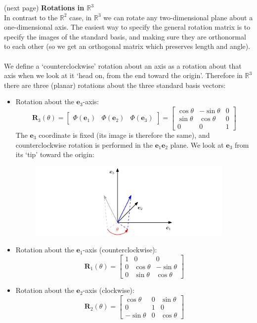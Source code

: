 \documentclass{report}
\begin{document}
(next page)
\newpage
\noindent\textbf{Rotations in $\mathbb{R}^3$}\\
In contrast to the $\mathbb{R}^2$ case, in $\mathbb{R}^3$ we can rotate any two-dimensional plane about a
one-dimensional axis. The easiest way to specify the general rotation matrix is to specify the images of the 
standard basis, and making sure they are orthonormal to each other (so we get an orthogonal matrix which
preserves length and angle).\\
\vspace{1mm}\\
We define a `counterclockwise' rotation about an axis as
a rotation about that axis when we look
at it `head on, from the end toward the origin'. Therefore in $\mathbb{R}^3$ there are three (planar) 
rotations about the three standard basis vectors:
\begin{itemize}
\item Rotation about the $\bm{e}_3$-axis:
\begin{equation*}
\bm{R}_3(\theta)=\begin{bmatrix}\Phi(\bm{e}_1)&\Phi(\bm{e}_2)&\Phi(\bm{e}_3)\end{bmatrix}=
\begin{bmatrix}\cos\theta&-\sin\theta&0\\
\sin\theta&\cos\theta&0\\0&0&1\end{bmatrix}
\end{equation*}
The $\bm{e}_3$ coordinate is fixed (its image is therefore the same), and counterclockwise rotation is
performed in the $\bm{e}_1\bm{e}_2$ plane. We look at $\bm{e}_3$ from its `tip' toward the origin:
\begin{figure}[h]
\includegraphics[width=10cm]{13}\\
\centering
\end{figure}
\item Rotation about the $\bm{e}_1$-axis (counterclockwise):
\begin{equation*}
\bm{R}_1(\theta)=
\begin{bmatrix}1&0&0\\
0&\cos\theta&-\sin\theta\\
0&\sin\theta&\cos\theta\end{bmatrix}
\end{equation*}
\item Rotation about the $\bm{e}_2$-axis (clockwise):
\begin{equation*}
\bm{R}_2(\theta)=
\begin{bmatrix}
\cos\theta&0&\sin\theta\\
0&1&0\\-\sin\theta&0&\cos\theta\end{bmatrix}
\end{equation*}
\end{itemize}
\end{document}
